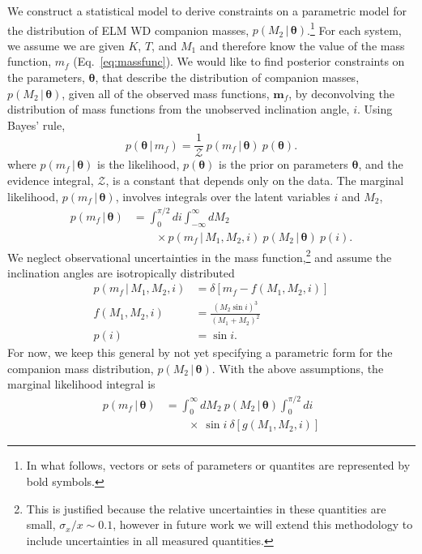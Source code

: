 \documentclass[letterpaper,12pt,preprint]{aastex}
\newcommand{\given}{\,|\,}
\newcommand{\bs}[1]{\boldsymbol{#1}}
\begin{document}
We construct a statistical model to derive constraints on a parametric model for the distribution of ELM WD companion masses, $p(M_2 \given \bs{\theta})$.\footnote{In what follows, vectors or sets of parameters or quantites are represented by bold symbols.} For each system, we assume we are given $K$, $T$, and $M_1$ and therefore know the value of the mass function, $m_f$ (Eq.~\ref{eq:massfunc}). We would like to find posterior constraints on the parameters, $\bs{\theta}$, that describe the distribution of companion masses, $p(M_2\given \bs{\theta})$, given all of the observed mass functions, $\bs{m}_f$, by deconvolving the distribution of mass functions from the unobserved inclination angle, $i$. Using Bayes' rule,
\begin{equation}
    p(\bs{\theta} \given m_f) = \frac{1}{\mathcal{Z}}~p(m_f \given \bs{\theta})~p(\bs{\theta}).
\end{equation}
where $p(m_f \given \bs{\theta})$ is the likelihood, $p(\bs{\theta})$ is the prior on parameters $\bs{\theta}$, and the evidence integral, $\mathcal{Z}$, is a constant that depends only on the data. The marginal likelihood, $p(m_f \given \bs{\theta})$, involves integrals over the latent variables $i$ and $M_2$,
\begin{align}
    p(m_f \given \bs{\theta}) &= \int_0^{\pi/2} di \int_{-\infty}^\infty dM_2  \nonumber \\
      & \qquad {} \times p(m_f \given M_1, M_2, i)~p(M_2 \given \bs{\theta})~p(i).
\end{align}
We neglect observational uncertainties in the mass function,\footnote{This is justified because the relative uncertainties in these quantities are small, $\sigma_x / x \sim 0.1$, however in future work we will extend this methodology to include uncertainties in all measured quantities.} and assume the inclination angles are isotropically distributed
\begin{align}
	p(m_f \given M_1, M_2, i) &= \delta \left[m_f - f(M_1, M_2, i) \right]\\
	f(M_1, M_2, i) &= \frac{(M_2 \sin i)^3}{(M_1 + M_2)^2}\\
	p(i) &= \sin i.
\end{align}
For now, we keep this general by not yet specifying a parametric form for the companion mass distribution, $p(M_2 \given \bs{\theta})$. With the above assumptions, the marginal likelihood integral is
\begin{align}
    p(m_f \given \bs{\theta}) &= \int_{0}^\infty dM_2 ~p(M_2 \given \bs{\theta}) \int_0^{\pi/2} di  \nonumber \\
    & \qquad {} \times ~\sin i ~ \delta \left[g(M_1,M_2,i) \right]\label{eq:delta}
\end{align}
\end{document}
